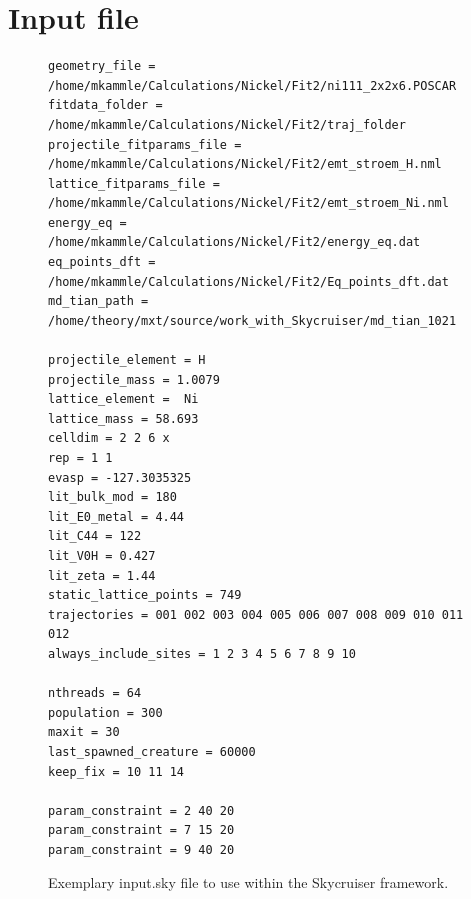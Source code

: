 \documentclass[twoside, 11pt, titlepage, captions=nooneline, a4paper, headsepline]{scrbook}%
\newcommand{\9}{\mathrm}
\newcommand{\0}{\,\mathrm}
\begin{document}
\section{Input file}
\begin{figure}
\begin{verbatim}
geometry_file = /home/mkammle/Calculations/Nickel/Fit2/ni111_2x2x6.POSCAR
fitdata_folder = /home/mkammle/Calculations/Nickel/Fit2/traj_folder
projectile_fitparams_file = /home/mkammle/Calculations/Nickel/Fit2/emt_stroem_H.nml
lattice_fitparams_file = /home/mkammle/Calculations/Nickel/Fit2/emt_stroem_Ni.nml
energy_eq = /home/mkammle/Calculations/Nickel/Fit2/energy_eq.dat
eq_points_dft = /home/mkammle/Calculations/Nickel/Fit2/Eq_points_dft.dat
md_tian_path = /home/theory/mxt/source/work_with_Skycruiser/md_tian_1021

projectile_element = H
projectile_mass = 1.0079
lattice_element =  Ni
lattice_mass = 58.693
celldim = 2 2 6 x
rep = 1 1
evasp = -127.3035325
lit_bulk_mod = 180
lit_E0_metal = 4.44
lit_C44 = 122
lit_V0H = 0.427
lit_zeta = 1.44
static_lattice_points = 749
trajectories = 001 002 003 004 005 006 007 008 009 010 011 012
always_include_sites = 1 2 3 4 5 6 7 8 9 10

nthreads = 64
population = 300
maxit = 30
last_spawned_creature = 60000
keep_fix = 10 11 14

param_constraint = 2 40 20
param_constraint = 7 15 20
param_constraint = 9 40 20
\end{verbatim}
\caption{Exemplary input.sky file to use within the Skycruiser framework.}
\label{SkycruiserInput}
\end{figure}
\end{document}
